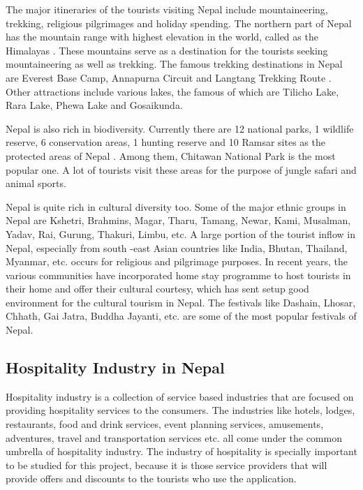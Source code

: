 \documentclass[12pt, a4paper, oneside]{article}
\begin{document}
The major itineraries of the tourists visiting Nepal include mountaineering, trekking, religious pilgrimages and holiday spending. The northern part of Nepal has the mountain range with highest elevation in the world, called as the Himalayas \cite{himalayas}. These mountains serve as a destination for the tourists seeking mountaineering as well as trekking. The famous trekking destinations in Nepal are Everest Base Camp, Annapurna Circuit and Langtang Trekking Route \cite{trekkingroutes}. Other attractions include various lakes, the famous of which are Tilicho Lake, Rara Lake, Phewa Lake and Gosaikunda.

Nepal is also rich in biodiversity. Currently there are 12 national parks, 1 wildlife reserve, 6 conservation areas, 1 hunting reserve and 10 Ramsar sites as the protected areas of Nepal \cite{protectedareas}. Among them, Chitawan National Park is the most popular one. A lot of tourists visit these areas for the purpose of jungle safari and animal sports.

Nepal is quite rich in cultural diversity too. Some of the major ethnic groups in Nepal are Kshetri, Brahmins, Magar, Tharu, Tamang, Newar, Kami, Musalman, Yadav, Rai, Gurung, Thakuri, Limbu, etc. A large portion of the tourist inflow in Nepal, especially from south -east Asian countries like India, Bhutan, Thailand, Myanmar, etc. occurs for religious and pilgrimage purposes. In recent years, the various communities have incorporated home stay programme to host tourists in their home and offer their cultural courtesy, which has sent setup good environment for the cultural tourism in Nepal. The festivals like Dashain, Lhosar, Chhath, Gai Jatra, Buddha Jayanti, etc. are some of the most popular festivals of Nepal.

\subsection{Hospitality Industry in Nepal}
Hospitality industry is a collection of service based industries that are focused on providing hospitality services to the consumers. The industries like hotels, lodges, restaurants, food and drink services, event planning services, amusements, adventures, travel and transportation services etc. all come under the common umbrella of hospitality industry. The industry of hospitality is specially important to be studied for this project, because it is those service providers that will provide offers and discounts to the tourists who use the application.
\end{document}
